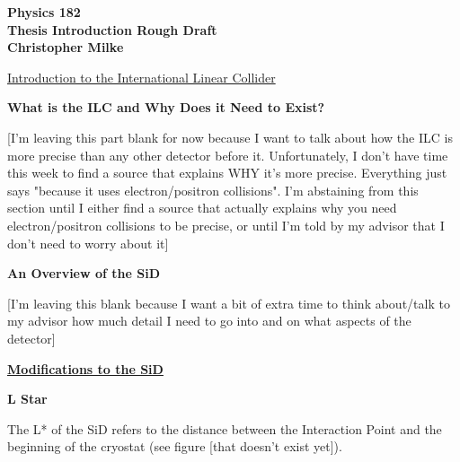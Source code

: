 \documentclass{article}
\begin{document}
    \begin{center}
        \bf{\large Physics 182 \\ Thesis Introduction Rough Draft \\ Christopher Milke}
    \end{center}


    \vspace{10mm}
    \begin{center}
        \underline{ \large Introduction to the International Linear Collider }
    \end{center}
        \begin{center}
            \bf{What is the ILC and Why Does it Need to Exist?}
        \end{center}

        [I'm leaving this part blank for now because I want to talk about how the ILC is more precise than any other detector before it. Unfortunately, I don't have time this week to find a source that explains WHY it's more precise. Everything just says "because it uses electron/positron collisions". I'm abstaining from this section until I either find a source that actually explains why you need electron/positron collisions to be precise, or until I'm told by my advisor that I don't need to worry about it]

        \vspace{5mm}
        \begin{center}
            \bf{An Overview of the SiD}
        \end{center}

        [I'm leaving this blank because I want a bit of extra time to think about/talk to my advisor how much detail I need to go into and on what aspects of the detector]



    \vspace{10mm}
    \begin{center}
        \underline{\bf{\large Modifications to the SiD}}
    \end{center}
        \begin{center}
            \bf{L Star}
        \end{center}

        The L* of the SiD refers to the distance between the Interaction Point and the beginning of the cryostat (see figure [that doesn't exist yet]).
\end{document}
